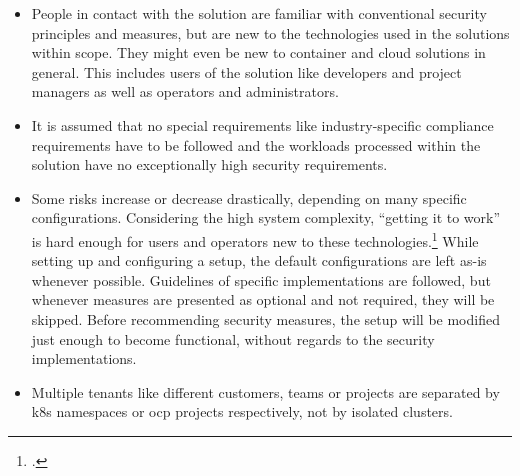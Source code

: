\begin{itemize}

\item People in contact with the solution are familiar with conventional security principles and measures, but are new to the technologies used in the solutions within scope. They might even be new to container and cloud solutions in general. This includes users of the solution like developers and project managers as well as operators and administrators.

\item It is assumed that no special requirements like industry-specific compliance requirements have to be followed and the workloads processed within the solution have no exceptionally high security requirements. 


\item Some risks increase or decrease drastically, depending on many specific configurations. Considering the high system complexity, ``getting it to work'' is hard enough for users and operators new to these technologies.\footcite[][, starting at 3:05]{hackAndHarden} While setting up and configuring a setup, the default configurations are left as-is whenever possible. Guidelines of specific implementations are followed, but whenever measures are presented as optional and not required, they will be skipped. Before recommending security measures, the setup will be modified just enough to become functional, without regards to the security implementations.

\item Multiple tenants like different customers, teams or projects are separated by \gls{k8s} namespaces or \gls{ocp} projects respectively, not by isolated clusters.

\end{itemize}

